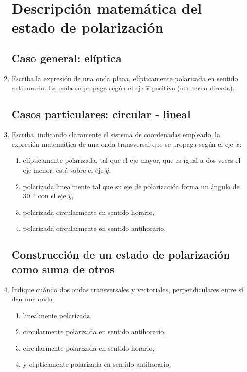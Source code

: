 \documentclass[11pt,spanish,a4paper,twoside]{article}
\begin{document}
\begin{enumerate}
\section*{Descripción matemática del estado de polarización}

\subsection*{Caso general: elíptica}

\item
Escriba la expresión de una onda plana, elípticamente polarizada en sentido antihorario.
La onda se propaga según el eje \(\hat{x}\) positivo (use terna directa).


\subsection*{Casos particulares: circular - lineal}
\item
Escriba, indicando claramente el sistema de coordenadas empleado, la expresión matemática de una onda transversal que se propaga según el eje \(\hat{x}\):
\begin{enumerate}
  \item elípticamente polarizada, tal que el eje mayor, que es igual a dos veces el eje menor, está sobre el eje \(\hat{y}\),
  \item polarizada linealmente tal que su eje de polarización forma un ángulo de \SI{30}{\degree} con el eje \(\hat{y}\),
  \item polarizada circularmente en sentido horario,
  \item polarizada circularmente en sentido antihorario.
\end{enumerate}



\subsection*{Construcción de un estado de polarización como suma de otros}

\item
Indique cuándo dos ondas transversales y vectoriales, perpendiculares entre sí dan una onda:
\begin{enumerate}
  \item linealmente polarizada,
  \item circularmente polarizada en sentido antihorario,
  \item circularmente polarizada en sentido horario,
  \item y elípticamente polarizada en sentido antihorario.
\end{enumerate}



\end{enumerate}
\end{document}
